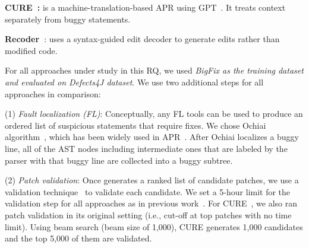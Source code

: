 
{\bf CURE~\cite{cure-icse21}:} is a machine-translation-based APR
using GPT~\cite{radford2018improving}.
It treats context separately from buggy statements.





{\bf Recoder~\cite{recoder-fse21}}: uses a syntax-guided edit decoder
to generate edits rather than modified code.


For all approaches under study in this RQ, we used {\em BigFix as the
training dataset and evaluated on Defects4J dataset}. 
We use two additional steps for all approaches in comparison:

(1) {\em Fault localization (FL)}: Conceptually, any FL
tools can be used to produce an ordered list of suspicious
statements that require fixes. We chose Ochiai
algorithm~\cite{abreu2006evaluation, pearson2017evaluating}, which has
been widely used in
APR~\cite{jiang2018shaping,xiong2017precise,koyuncu2018fixminer,xin2017leveraging,wen2018context,liu2018lsrepair}.
After Ochiai localizes a buggy line, all of the AST nodes including
intermediate ones that are labeled by the parser with that buggy line
are collected into a buggy subtree.

(2) {\em Patch validation}: Once {\tool} generates a ranked list of
candidate patches, we use a validation
technique~\cite{saha2017elixir,jiang2018shaping} to validate each
candidate.
We set a 5-hour limit for the validation step for all approaches as in
previous work~\cite{icse20,tbar-issta19}.
For CURE~\cite{cure-icse21}, we also ran patch validation in its
original setting (i.e., cut-off at top patches with no time
limit). Using beam search (beam size of 1,000), CURE generates 1,000
candidates and the top 5,000 of them are validated.

